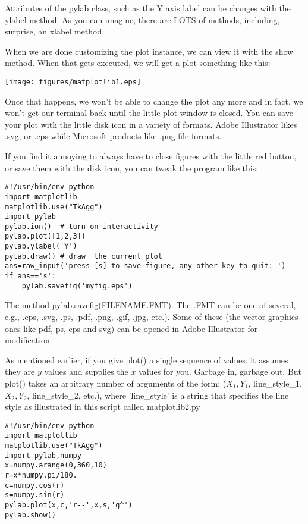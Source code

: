 {Attributes of the {\color{blue}pylab} class, such as the Y axis label can be changes with the {\color{blue}ylabel} method.  As you can imagine, there are LOTS of methods, including, surprise, an {\color{blue}xlabel} method.  

When we are done customizing the plot instance, we can view it with the {\color{blue}show} method.  When that gets executed, we will get a plot something like this:

   \texttt{[image: figures/matplotlib1.eps]} 
   
   \noindent Once that happens, we won't be able to change the plot any more and in fact, we won't get our terminal back until the little plot window is closed.   You can save your plot with the little disk icon in a variety of formats.  Adobe Illustrator likes .svg, or .eps while Microsoft products like .png file formats.  

If you find it annoying to always have to close figures with the little red button, or save them with the disk icon, you can tweak the program like this:

{\singlespacing \color{blue}\begin{verbatim}
#!/usr/bin/env python
import matplotlib
matplotlib.use("TkAgg") 
import pylab 
pylab.ion()  # turn on interactivity
pylab.plot([1,2,3]) 
pylab.ylabel('Y') 
pylab.draw() # draw  the current plot
ans=raw_input('press [s] to save figure, any other key to quit: ')
if ans=='s':
    pylab.savefig('myfig.eps')
\end{verbatim}}

\noindent The method {\color{blue}pylab.savefig(FILENAME.FMT)}.  The .FMT can be one of several, e.g., .eps, .svg, .ps, .pdf, .png, .gif, .jpg, etc.).   Some of these (the vector graphics ones like pdf,  ps, eps and svg) can be opened in Adobe Illustrator for modification.   


As mentioned earlier, if  you give {\color{blue}plot()} a single sequence of values, it assumes they are $y$ values and supplies the $x$ values for you.  Garbage in, garbage out.  But 
 {\color{blue}plot()} takes an arbitrary number of arguments of the form: ($X_1, Y_1$, line\_style\_1, $X_2, Y_2$, line\_style\_2,  etc.), 
 where 'line\_style' is a string that specifies the line style as illustrated in this script called {\color{blue}matplotlib2.py}


{\singlespacing \color{blue} \begin{verbatim}
#!/usr/bin/env python
import matplotlib
matplotlib.use("TkAgg")
import pylab,numpy
x=numpy.arange(0,360,10)
r=x*numpy.pi/180.
c=numpy.cos(r)
s=numpy.sin(r)
pylab.plot(x,c,'r--',x,s,'g^')
pylab.show()
\end{verbatim}}

}
